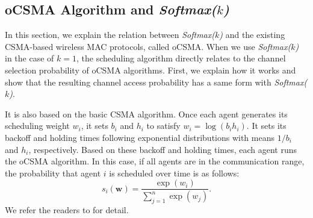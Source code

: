\subsection{oCSMA Algorithm and {\em Softmax($k$)}}
In this section, we explain the relation between {\em Softmax($k$)} and
the existing CSMA-based wireless MAC protocols, called oCSMA. When we
use {\em Softmax($k$)} in the case of $k = 1$, the scheduling
algorithm directly relates to the channel selection probability of
oCSMA algorithms. First, we explain how it works and show that the
resulting channel access probability has a same form with {\em
  Softmax($k$)}.

 It is also based on the basic CSMA
algorithm. Once each agent generates its scheduling weight $w_i$, it sets
$b_i$ and $h_i$ to satisfy $w_i = \log(b_i h_i)$. It sets its backoff
and holding times following exponential distributions with means
$1/b_i$ and $h_i$, respectively. Based on these backoff and holding
times, each agent runs the oCSMA algorithm. In this case, if all agents are
in the communication range, the probability that agent $i$ is
scheduled over time is as follows:
$$s_i (\bm{w}) 
= \frac{\exp(w_i)}{\sum_{j=1}^{n} \exp(w_j)}.$$
 We refer the readers to \citet{jang} for detail.

